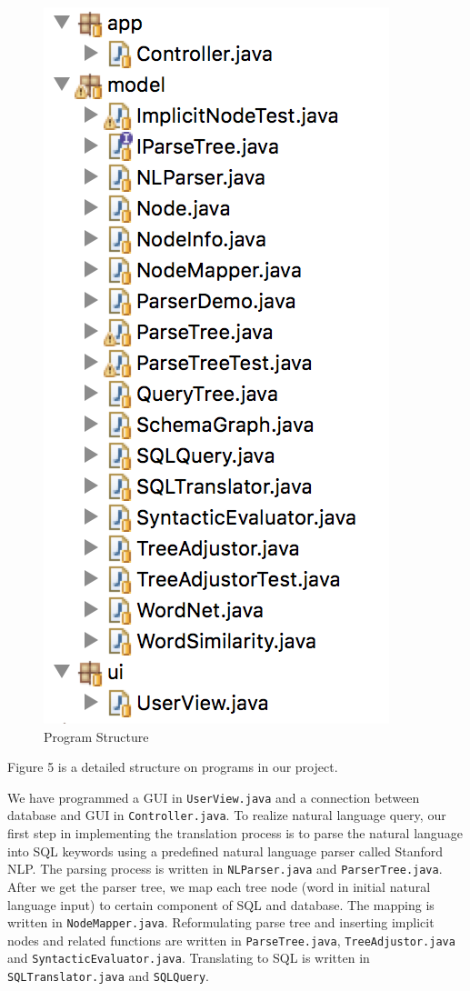 \documentclass[twocolumn]{article}
\begin{document}
\begin{figure}[ht]
  \centering
  \includegraphics[width=0.8\linewidth]{figures/program_structure.png}
  \caption{Program Structure}
\end{figure}
  
Figure 5 is a detailed structure on programs in our project.

We have programmed a GUI in \texttt{UserView.java} and a connection between database and GUI in \texttt{Controller.java}. To realize natural language query, our first step in implementing the translation process is to parse the natural language into SQL keywords using a predefined natural language parser called Stanford NLP. The parsing process is written in \texttt{NLParser.java} and \texttt{ParserTree.java}. After we get the parser tree, we map each tree node (word in initial natural language input) to certain component of SQL and database. The mapping is written in \texttt{NodeMapper.java}. Reformulating parse tree and inserting implicit nodes and related functions are written in \texttt{ParseTree.java}, \texttt{TreeAdjustor.java} and \texttt{SyntacticEvaluator.java}. Translating to SQL is written in \texttt{SQLTranslator.java} and \texttt{SQLQuery}.
\end{document}
